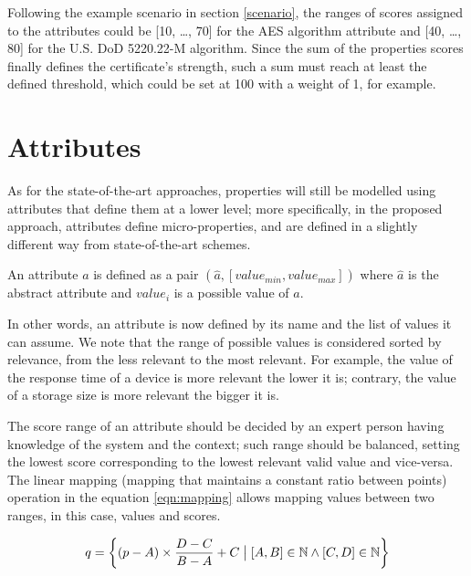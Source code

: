 \begin{example}
\label{xmp:1}
Following the example scenario in section \ref{scenario}, the ranges of scores assigned to the attributes could be [10, \dots, 70] for the AES algorithm attribute and [40, \dots, 80] for the U.S. DoD 5220.22-M algorithm.
Since the sum of the properties scores finally defines the certificate's strength, such a sum must reach at least the defined threshold, which could be set at 100 with a weight of 1, for example.
\end{example}


\section{Attributes}
As for the state-of-the-art approaches, properties will still be modelled using attributes that define them at a lower level; more specifically, in the proposed approach, attributes define micro-properties, and are defined in a slightly different way from state-of-the-art schemes. 

\begin{defn}
An attribute \(a\) is defined as a pair \((\hat{a}, [value_{min}, value_{max}])\) where \(\hat{a}\) is the abstract attribute and \(value_{i}\) is a possible value of \(a\). 
\end{defn}

In other words, an attribute is now defined by its name and the list of values it can assume. We note that the range of possible values is considered sorted by relevance, from the less relevant to the most relevant. For example, the value of the response time of a device is more relevant the lower it is; contrary, the value of a storage size is more relevant the bigger it is.

The score range of an attribute should be decided by an expert person having knowledge of the system and the context; such range should be balanced, setting the lowest score corresponding to the lowest relevant valid value and vice-versa.
The linear mapping (mapping that maintains a constant ratio between points) operation in the equation \ref{eqn:mapping} allows mapping values between two ranges, in this case, values and scores.

\begin{equation}
\label{eqn:mapping}
    q = \left \{ (p - A) \times \frac{D - C}{B - A} + C \bigm| [A, B] \in \mathbb{N} \wedge [C, D] \in \mathbb{N}  \right \}
\end{equation}

